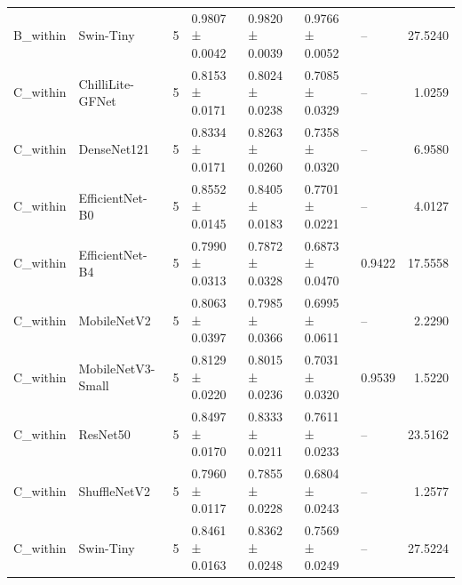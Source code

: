\begin{tabular}{llrllllr}
B\_within & Swin-Tiny & 5 & 0.9807 ± 0.0042 & 0.9820 ± 0.0039 & 0.9766 ± 0.0052 & -- & 27.5240 \\
C\_within & ChilliLite-GFNet & 5 & 0.8153 ± 0.0171 & 0.8024 ± 0.0238 & 0.7085 ± 0.0329 & -- & 1.0259 \\
C\_within & DenseNet121 & 5 & 0.8334 ± 0.0171 & 0.8263 ± 0.0260 & 0.7358 ± 0.0320 & -- & 6.9580 \\
C\_within & EfficientNet-B0 & 5 & 0.8552 ± 0.0145 & 0.8405 ± 0.0183 & 0.7701 ± 0.0221 & -- & 4.0127 \\
C\_within & EfficientNet-B4 & 5 & 0.7990 ± 0.0313 & 0.7872 ± 0.0328 & 0.6873 ± 0.0470 & 0.9422 & 17.5558 \\
C\_within & MobileNetV2 & 5 & 0.8063 ± 0.0397 & 0.7985 ± 0.0366 & 0.6995 ± 0.0611 & -- & 2.2290 \\
C\_within & MobileNetV3-Small & 5 & 0.8129 ± 0.0220 & 0.8015 ± 0.0236 & 0.7031 ± 0.0320 & 0.9539 & 1.5220 \\
C\_within & ResNet50 & 5 & 0.8497 ± 0.0170 & 0.8333 ± 0.0211 & 0.7611 ± 0.0233 & -- & 23.5162 \\
C\_within & ShuffleNetV2 & 5 & 0.7960 ± 0.0117 & 0.7855 ± 0.0228 & 0.6804 ± 0.0243 & -- & 1.2577 \\
C\_within & Swin-Tiny & 5 & 0.8461 ± 0.0163 & 0.8362 ± 0.0248 & 0.7569 ± 0.0249 & -- & 27.5224 \\
\bottomrule
\end{tabular}
